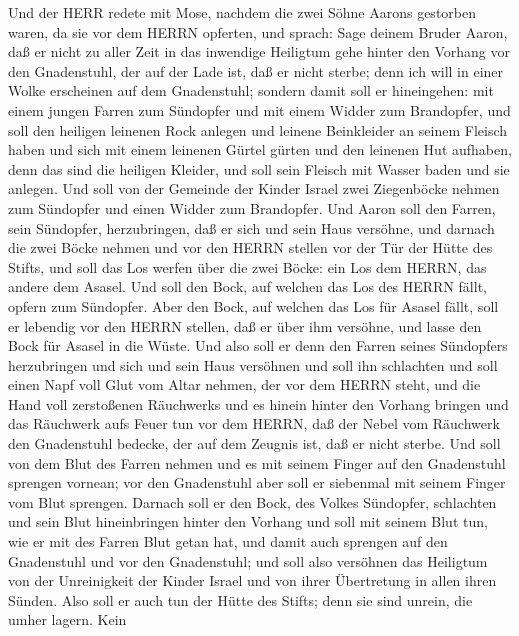  Und der HERR redete mit Mose, nachdem die zwei Söhne Aarons
gestorben waren, da sie vor dem HERRN opferten,  und sprach:
Sage deinem Bruder Aaron, daß er nicht zu aller Zeit in das inwendige
Heiligtum gehe hinter den Vorhang vor den Gnadenstuhl, der auf der Lade
ist, daß er nicht sterbe; denn ich will in einer Wolke erscheinen auf
dem Gnadenstuhl;  sondern damit soll er hineingehen: mit
einem jungen Farren zum Sündopfer und mit einem Widder zum Brandopfer,
 und soll den heiligen leinenen Rock anlegen und leinene
Beinkleider an seinem Fleisch haben und sich mit einem leinenen Gürtel
gürten und den leinenen Hut aufhaben, denn das sind die heiligen
Kleider, und soll sein Fleisch mit Wasser baden und sie anlegen.
 Und soll von der Gemeinde der Kinder Israel zwei
Ziegenböcke nehmen zum Sündopfer und einen Widder zum Brandopfer.
 Und Aaron soll den Farren, sein Sündopfer, herzubringen,
daß er sich und sein Haus versöhne,  und darnach die zwei
Böcke nehmen und vor den HERRN stellen vor der Tür der Hütte des Stifts,
 und soll das Los werfen über die zwei Böcke: ein Los dem
HERRN, das andere dem Asasel.  Und soll den Bock, auf
welchen das Los des HERRN fällt, opfern zum Sündopfer. 
Aber den Bock, auf welchen das Los für Asasel fällt, soll er lebendig
vor den HERRN stellen, daß er über ihm versöhne, und lasse den Bock für
Asasel in die Wüste.  Und also soll er denn den Farren
seines Sündopfers herzubringen und sich und sein Haus versöhnen und soll
ihn schlachten  und soll einen Napf voll Glut vom Altar
nehmen, der vor dem HERRN steht, und die Hand voll zerstoßenen
Räuchwerks und es hinein hinter den Vorhang bringen  und
das Räuchwerk aufs Feuer tun vor dem HERRN, daß der Nebel vom Räuchwerk
den Gnadenstuhl bedecke, der auf dem Zeugnis ist, daß er nicht sterbe.
 Und soll von dem Blut des Farren nehmen und es mit seinem
Finger auf den Gnadenstuhl sprengen vornean; vor den Gnadenstuhl aber
soll er siebenmal mit seinem Finger vom Blut sprengen. 
Darnach soll er den Bock, des Volkes Sündopfer, schlachten und sein Blut
hineinbringen hinter den Vorhang und soll mit seinem Blut tun, wie er
mit des Farren Blut getan hat, und damit auch sprengen auf den
Gnadenstuhl und vor den Gnadenstuhl;  und soll also
versöhnen das Heiligtum von der Unreinigkeit der Kinder Israel und von
ihrer Übertretung in allen ihren Sünden. Also soll er auch tun der Hütte
des Stifts; denn sie sind unrein, die umher lagern.  Kein
